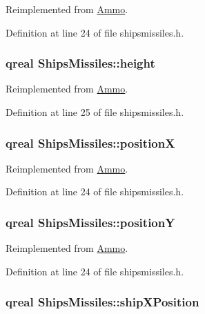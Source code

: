 Reimplemented from \hyperlink{class_ammo_a1156ff1439690bf121841528585aa026}{Ammo}.

Definition at line 24 of file shipsmissiles.h.\hypertarget{class_ships_missiles_a1a31e013e3e81f518aa8f99bbb684357}{
\subsubsection[{height}]{\setlength{\rightskip}{0pt plus 5cm}qreal {\bf ShipsMissiles::height}}}
\label{class_ships_missiles_a1a31e013e3e81f518aa8f99bbb684357}


Reimplemented from \hyperlink{class_ammo_a7ee07e5c3778fe15aeef8126a5251e3b}{Ammo}.

Definition at line 25 of file shipsmissiles.h.\hypertarget{class_ships_missiles_ad7c34c9db83c3ed6ecca7ec25c119123}{
\subsubsection[{positionX}]{\setlength{\rightskip}{0pt plus 5cm}qreal {\bf ShipsMissiles::positionX}}}
\label{class_ships_missiles_ad7c34c9db83c3ed6ecca7ec25c119123}


Reimplemented from \hyperlink{class_ammo_a7df8c23c0a3023e013c25e2b3fff5385}{Ammo}.

Definition at line 24 of file shipsmissiles.h.\hypertarget{class_ships_missiles_ace3adf616edc81579fcfd0b2dc76496f}{
\subsubsection[{positionY}]{\setlength{\rightskip}{0pt plus 5cm}qreal {\bf ShipsMissiles::positionY}}}
\label{class_ships_missiles_ace3adf616edc81579fcfd0b2dc76496f}


Reimplemented from \hyperlink{class_ammo_a71fc5db64ac2f32ca10e22f7a7ff0c88}{Ammo}.

Definition at line 24 of file shipsmissiles.h.\hypertarget{class_ships_missiles_a728619287aa81ab7bcbdbd034d1c3c8a}{
\subsubsection[{shipXPosition}]{\setlength{\rightskip}{0pt plus 5cm}qreal {\bf ShipsMissiles::shipXPosition}}}
\label{class_ships_missiles_a728619287aa81ab7bcbdbd034d1c3c8a}


